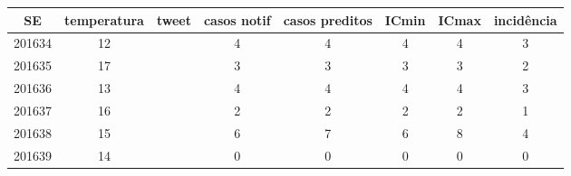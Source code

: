 \begin{tabular}{c|ccccccc}
  \hline
SE & temperatura & tweet & casos notif & casos preditos & ICmin & ICmax & incidência \\ 
  \hline
201634 & 12 &  & 4 & 4 & 4 & 4 & 3 \\ 
  201635 & 17 &  & 3 & 3 & 3 & 3 & 2 \\ 
  201636 & 13 &  & 4 & 4 & 4 & 4 & 3 \\ 
  201637 & 16 &  & 2 & 2 & 2 & 2 & 1 \\ 
  201638 & 15 &  & 6 & 7 & 6 & 8 & 4 \\ 
  201639 & 14 &  & 0 & 0 & 0 & 0 & 0 \\ 
   \hline
\end{tabular}
